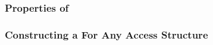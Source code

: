 \subsubsection{Properties of }\label{subsubsec:Properties_Access_Structures}
\subsubsection{Constructing a  For Any Access Structure}\label{subsubsec:Construct_Perfect_Secret_Sharing_Scheme}
